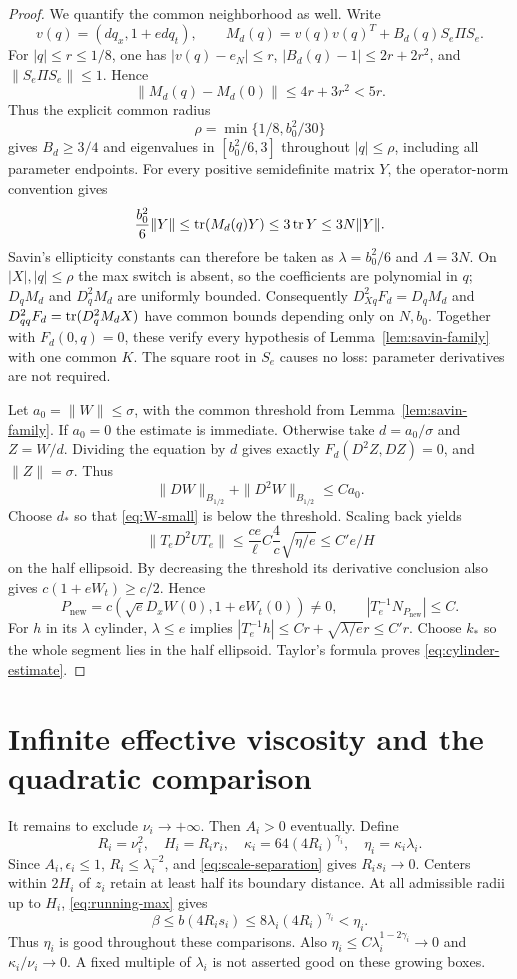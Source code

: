 \begin{proof}
We quantify the common neighborhood as well. Write
\[
 v(q)=(dq_x,1+edq_t),\qquad
 M_d(q)=v(q)v(q)^T+B_d(q)S_e\Pi S_e.
\]
For $|q|\leq r\leq1/8$, one has $|v(q)-e_N|\leq r$,
$|B_d(q)-1|\leq2r+2r^2$, and $\|S_e\Pi S_e\|\leq1$. Hence
\[
 \|M_d(q)-M_d(0)\|\leq4r+3r^2<5r.
\]
Thus the explicit common radius
\[
 \rho=\min\{1/8,b_0^2/30\}
\]
gives $B_d\geq3/4$ and eigenvalues in $[b_0^2/6,3]$ throughout
$|q|\leq\rho$, including all parameter endpoints. For every positive
semidefinite matrix $Y$, the operator-norm convention gives
\[
 \frac{b_0^2}{6}\|Y\|\leq\operatorname{tr}(M_d(q)Y)
                  \leq3\operatorname{tr} Y\leq3N\|Y\|.
\]
Savin's ellipticity constants can therefore be taken as
$\lambda=b_0^2/6$ and $\Lambda=3N$. On $|X|,|q|\leq\rho$ the
max switch is absent, so the coefficients are polynomial in $q$;
$D_qM_d$ and $D_q^2M_d$ are uniformly bounded. Consequently
$D^2_{Xq}F_d=D_qM_d$ and
$D^2_{qq}F_d=\operatorname{tr}(D_q^2M_dX)$ have common bounds depending only on
$N,b_0$. Together with $F_d(0,q)=0$, these verify every hypothesis
of Lemma~\ref{lem:savin-family} with one common $K$. The square
root in $S_e$ causes no loss: parameter derivatives are not required.

Let $a_0=\|W\|\leq\sigma$, with the common threshold from
Lemma~\ref{lem:savin-family}. If $a_0=0$ the estimate is immediate.
Otherwise take $d=a_0/\sigma$ and $Z=W/d$. Dividing the equation by
$d$ gives exactly $F_d(D^2Z,DZ)=0$, and $\|Z\|=\sigma$. Thus
\[
 \|DW\|_{B_{1/2}}+\|D^2W\|_{B_{1/2}}\leq C a_0.
\]
Choose $d_*$ so that \eqref{eq:W-small} is below the threshold.
Scaling back yields
\[
 \|T_eD^2UT_e\|\leq\frac{ce}{\ell}C\frac4c\sqrt{\eta/e}
                  \leq C'e/H
\]
on the half ellipsoid. By decreasing the threshold its derivative
conclusion also gives $c(1+eW_t)\geq c/2$. Hence
\[
 P_{\mathrm{new}}=c(\sqrt e D_xW(0),1+eW_t(0))\neq0,
 \qquad |T_e^{-1}N_{P_{\mathrm{new}}}|\leq C.
\]
For $h$ in its $\lambda$ cylinder, $\lambda\leq e$ implies
$|T_e^{-1}h|\leq Cr+\sqrt{\lambda/e}r\leq C'r$.
Choose $k_*$ so the whole segment lies in the half ellipsoid.
Taylor's formula proves \eqref{eq:cylinder-estimate}.
\end{proof}

\section{Infinite effective viscosity and the quadratic comparison}

It remains to exclude $\nu_i\to+\infty$. Then $A_i>0$ eventually.
Define
\[
 R_i=\nu_i^2,\quad H_i=R_ir_i,\quad
 \kappa_i=64(4R_i)^{\gamma_i},\quad \eta_i=\kappa_i\lambda_i.
\]
Since $A_i,\epsilon_i\leq1$, $R_i\leq\lambda_i^{-2}$, and
\eqref{eq:scale-separation} gives $R_is_i\to0$. Centers within
$2H_i$ of $z_i$ retain at least half its boundary distance. At all
admissible radii up to $H_i$, \eqref{eq:running-max} gives
\[
 \beta\leq b(4R_is_i)\leq8\lambda_i(4R_i)^{\gamma_i}<\eta_i.
\]
Thus $\eta_i$ is good throughout these comparisons. Also
$\eta_i\leq C\lambda_i^{1-2\gamma_i}\to0$ and
$\kappa_i/\nu_i\to0$. A fixed multiple of $\lambda_i$ is not
asserted good on these growing boxes.

